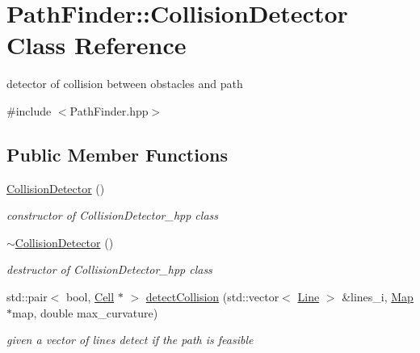 \hypertarget{class_path_finder_1_1_collision_detector}{}\section{Path\+Finder\+:\+:Collision\+Detector Class Reference}
\label{class_path_finder_1_1_collision_detector}


detector of collision between obstacles and path  




{\ttfamily \#include $<$Path\+Finder.\+hpp$>$}

\subsection*{Public Member Functions}
\begin{DoxyCompactItemize}
\item 
\mbox{\label{class_path_finder_1_1_collision_detector_a497ba69e02a5a421bfc1272bc2190186}} 
\mbox{\hyperlink{class_path_finder_1_1_collision_detector_a497ba69e02a5a421bfc1272bc2190186}{Collision\+Detector}} ()
\begin{DoxyCompactList}\small\item\em constructor of Collision\+Detector\+\_\+hpp class \end{DoxyCompactList}\item 
\mbox{\label{class_path_finder_1_1_collision_detector_acf671829eb5a67ae4f557773e849ee5b}} 
\mbox{\hyperlink{class_path_finder_1_1_collision_detector_acf671829eb5a67ae4f557773e849ee5b}{$\sim$\+Collision\+Detector}} ()
\begin{DoxyCompactList}\small\item\em destructor of Collision\+Detector\+\_\+hpp class \end{DoxyCompactList}\item 
std\+::pair$<$ bool, \mbox{\hyperlink{class_cell}{Cell}} $\ast$ $>$ \mbox{\hyperlink{class_path_finder_1_1_collision_detector_a354ca35cb8cec9fc3ece6073170e6ef1}{detect\+Collision}} (std\+::vector$<$ \mbox{\hyperlink{class_line}{Line}} $>$ \&lines\+\_\+i, \mbox{\hyperlink{class_map}{Map}} $\ast$map, double max\+\_\+curvature)
\begin{DoxyCompactList}\small\item\em given a vector of lines detect if the path is feasible \end{DoxyCompactList}\end{DoxyCompactItemize}


